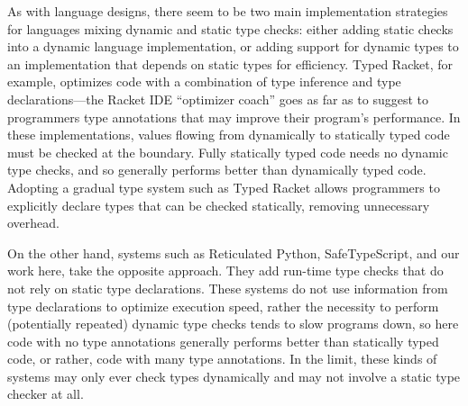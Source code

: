 
As with language designs, there seem to be two main implementation
strategies for languages mixing dynamic and static type checks: either
adding static checks into a dynamic language implementation, or adding
support for dynamic types to an implementation that depends on
static types for efficiency. Typed Racket, for example, optimizes code with
a combination of type inference and type declarations---the Racket
IDE ``optimizer coach'' goes as far as to suggest to programmers type
annotations that may improve their program's performance\citep{optimizerCoach2012}. In these implementations, values flowing
from dynamically to statically typed code must be checked at the
boundary.  Fully statically typed code needs no dynamic type checks,
and so generally performs better than dynamically typed code. Adopting
a gradual type system such as Typed Racket\citep{typedScheme08} allows
programmers to explicitly declare types that can be checked statically,
removing unnecessary overhead.

On the other hand, systems such as Reticulated Python\citep{reticPython2014}, SafeTypeScript\citep{Richards2017}, and our
work here, take the opposite approach.
They add run-time type checks that do not rely on static
type declarations. These systems do not use information from type
declarations to optimize execution speed, rather the necessity to
perform (potentially repeated) dynamic type checks tends to slow
programs down, so here code with no type annotations generally
performs better than statically typed code, or rather, code with many
type annotations. In the limit, these kinds of systems may only ever
check types dynamically and may not involve a static type checker at
all. 

